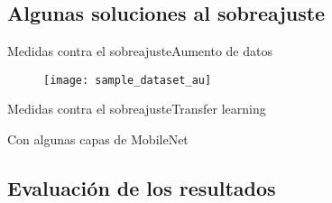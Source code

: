 \documentclass[aspectratio = 169]{beamer}
\begin{document}
		\subsection{Algunas soluciones al sobreajuste}
		
			\begin{frame}{Medidas contra el sobreajuste}{Aumento de datos}
				\begin{figure}
					\centering
					\texttt{[image: sample\_dataset\_au]}
					\label{fig:sample_dataset_au}
				\end{figure}
			\end{frame}
			
			\begin{frame}{Medidas contra el sobreajuste}{Transfer learning}
				\begin{block}{Con algunas capas de MobileNet}
					\begin{figure}
						\centering
						
						
						\label{fig:tb_tl_c}
					\end{figure}
				\end{block}
			\end{frame}
			
		\subsection{Evaluación de los resultados}
		
\end{document}
